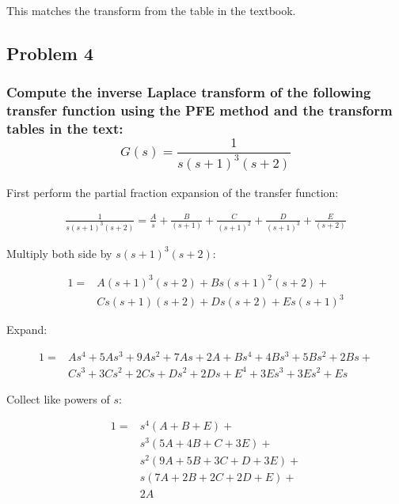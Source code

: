 \documentclass[12pt, letterpaper]{../assignment}
\begin{document}
This matches the transform from the table in the textbook.

\subsection*{Problem 4}
\subsubsection*{Compute the inverse Laplace transform of the following transfer function using the PFE method and the transform tables in the text:
$$ G(s) = \frac{1}{s(s+1)^3(s+2)} $$}

First perform the partial fraction expansion of the transfer function:

\begin{equation*}
    \begin{aligned}
        \frac{1}{s(s+1)^3(s+2)} = \frac{A}{s} + \frac{B}{(s+1)} + \frac{C}{(s+1)^2} + \frac{D}{(s+1)^3} + \frac{E}{(s+2)}
    \end{aligned}
\end{equation*}

Multiply both side by $s(s+1)^3(s+2)$:

\begin{equation*}
    \begin{aligned}
        1 = &A(s+1)^3(s+2) + B s(s+1)^2(s+2) +\\ &C s(s+1)(s+2) + D s (s+2) + Es(s+1)^3
\end{aligned}
\end{equation*}

Expand:

\begin{equation*}
    \begin{aligned}
        1 = &A s^4 + 5A s^3 + 9A s^2 + 7 A s +2A  + B s^4 + 4 B s^3 + 5 B s^2 + 2 B s +\\ &C s^3 +  3C s^2 + 2C s  + Ds^2+2 D s + E ^4 + 3E s^3 + 3E s^2+ Es
    \end{aligned}
\end{equation*}

Collect like powers of $s$:

\begin{equation*}
    \begin{aligned}
        1 = &s^4(A + B + E) + \\ &s^3 (5A + 4B + C + 3E) + \\ &s^2 (9A + 5B + 3C + D + 3E) + \\ &s(7A + 2B + 2C + 2D + E) + \\ &2A
    \end{aligned}
\end{equation*}
\end{document}

